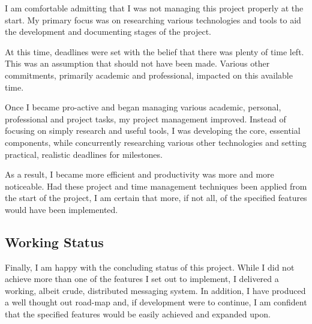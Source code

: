 I am comfortable admitting that I was not managing this project properly
at the start. My primary focus was on researching various technologies
and tools to aid the development and documenting stages of the project.


At this time, deadlines were set with the belief that there was plenty
of time left. This was an assumption that should not have been made.
Various other commitments, primarily academic and professional, impacted
on this available time.


Once I became pro-active and began managing various academic, personal,
professional and project tasks, my project management improved. Instead
of focusing on simply research and useful tools, I was developing the
core, essential components, while concurrently researching various other
technologies and setting practical, realistic deadlines for milestones.


As a result, I became more efficient and productivity was more and more
noticeable. Had these project and time management techniques been
applied from the start of the project, I am certain that more, if not
all, of the specified features would have been implemented.

\subsection{Working Status}

Finally, I am happy with the concluding status of this project. While I
did not achieve more than one of the features I set out to implement, I
delivered a working, albeit crude, distributed messaging system. In
addition, I have produced a well thought out road-map and, if 
development were to continue, I am confident that the specified features
would be easily achieved and expanded upon. 


